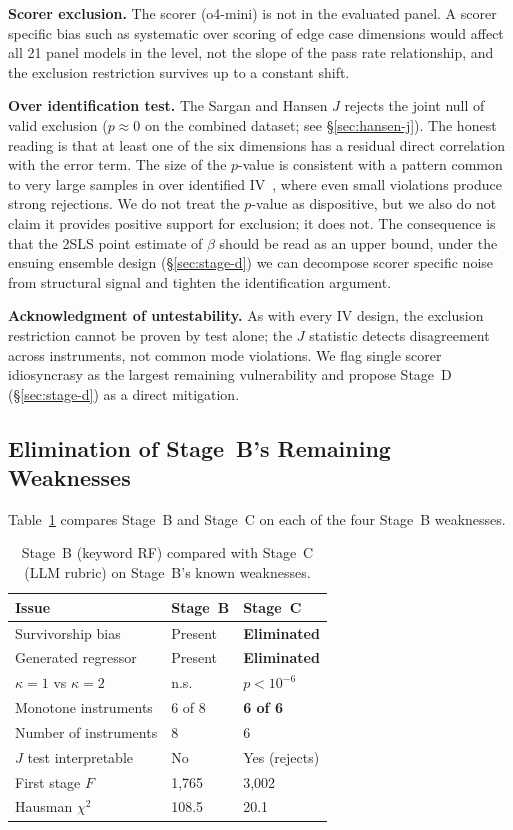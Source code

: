 \documentclass[conference]{IEEEtran}
\begin{document}
\textbf{Scorer exclusion.} The scorer (o4-mini) is not in the evaluated panel. A scorer specific bias such as systematic over scoring of edge case dimensions would affect all 21 panel models in the level, not the slope of the pass rate relationship, and the exclusion restriction survives up to a constant shift.

\textbf{Over identification test.} The Sargan and Hansen $J$ rejects the joint null of valid exclusion ($p\approx 0$ on the combined dataset; see \S\ref{sec:hansen-j}). The honest reading is that at least one of the six dimensions has a residual direct correlation with the error term. The size of the $p$-value is consistent with a pattern common to very large samples in over identified IV~\cite{bowsher2002reject}, where even small violations produce strong rejections. We do not treat the $p$-value as dispositive, but we also do not claim it provides positive support for exclusion; it does not. The consequence is that the 2SLS point estimate of $\beta$ should be read as an upper bound, under the ensuing ensemble design (\S\ref{sec:stage-d}) we can decompose scorer specific noise from structural signal and tighten the identification argument.

\textbf{Acknowledgment of untestability.} As with every IV design, the exclusion restriction cannot be proven by test alone; the $J$ statistic detects disagreement across instruments, not common mode violations. We flag single scorer idiosyncrasy as the largest remaining vulnerability and propose Stage~D (\S\ref{sec:stage-d}) as a direct mitigation.

\subsection{Elimination of Stage~B's Remaining Weaknesses}

Table~\ref{tab:b-vs-c} compares Stage~B and Stage~C on each of the four Stage~B weaknesses.

\begin{table}[h]
\centering
\caption{Stage~B (keyword RF) compared with Stage~C (LLM rubric) on Stage~B's known weaknesses.}
\label{tab:b-vs-c}
\begin{tabular}{@{}lll@{}}
\toprule
Issue & Stage~B & Stage~C \\
\midrule
Survivorship bias        & Present & \textbf{Eliminated} \\
Generated regressor      & Present & \textbf{Eliminated} \\
$\kappa=1$ vs $\kappa=2$ & n.s.    & $p<10^{-6}$ \\
Monotone instruments     & 6 of 8  & \textbf{6 of 6} \\
Number of instruments    & 8       & 6 \\
$J$ test interpretable   & No      & Yes (rejects) \\
First stage $F$          & 1{,}765 & 3{,}002 \\
Hausman $\chi^2$         & 108.5   & 20.1 \\
\bottomrule
\end{tabular}
\end{table}
\end{document}
